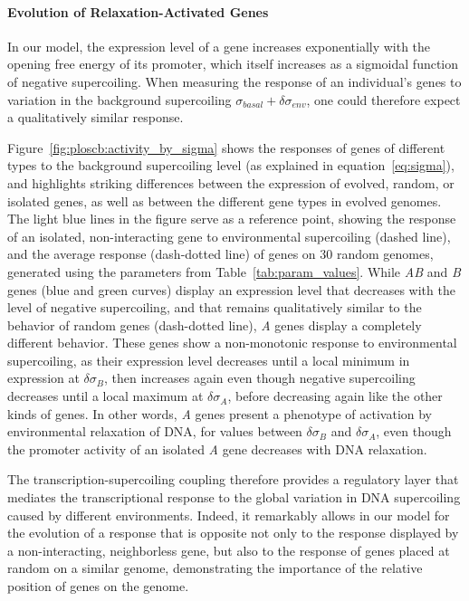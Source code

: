 \paragraph{Evolution of Relaxation-Activated Genes}
In our model, the expression level of a gene increases exponentially with the opening free energy of its promoter, which itself increases as a sigmoidal function of negative supercoiling.
When measuring the response of an individual's genes to variation in the background supercoiling $\sigma_{basal} + \delta\sigma_{env}$, one could therefore expect a qualitatively similar response.

Figure~\ref{fig:ploscb:activity_by_sigma} shows the responses of genes of different types to the background supercoiling level (as explained in equation~\ref{eq:sigma}), and highlights striking differences between the expression of evolved, random, or isolated genes, as well as between the different gene types in evolved genomes.
The light blue lines in the figure serve as a reference point, showing the response of an isolated, non-interacting gene to environmental supercoiling (dashed line), and the average response (dash-dotted line) of genes on 30 random genomes, generated using the parameters from Table~\ref{tab:param_values}.
While \emph{AB} and \emph{B} genes (blue and green curves) display an expression level that decreases with the level of negative supercoiling, and that remains qualitatively similar to the behavior of random genes (dash-dotted line), \emph{A} genes display a completely different behavior.
These genes show a non-monotonic response to environmental supercoiling, as their expression level decreases until a local minimum in expression at $\delta\sigma_B$, then increases again even though negative supercoiling decreases until a local maximum at $\delta\sigma_A$, before decreasing again like the other kinds of genes.
In other words, \emph{A} genes present a phenotype of activation by environmental relaxation of DNA, for values between $\delta\sigma_B$ and $\delta\sigma_A$, even though the promoter activity of an isolated \emph{A} gene decreases with DNA relaxation.

The transcription-supercoiling coupling therefore provides a regulatory layer that mediates the transcriptional response to the global variation in DNA supercoiling caused by different environments.
Indeed, it remarkably allows in our model for the evolution of a response that is opposite not only to the response displayed by a non-interacting, neighborless gene, but also to the response of genes placed at random on a similar genome, demonstrating the importance of the relative position of genes on the genome.


